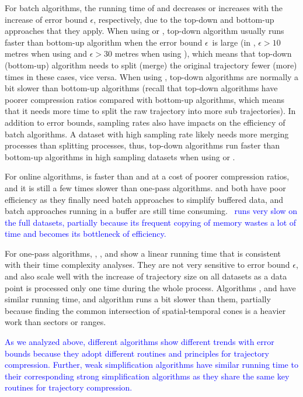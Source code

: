 {For batch algorithms, the running time of \dpa and \tpa decreases or increases with the increase of error bound $\epsilon$, respectively, due to the top-down and bottom-up approaches that they apply. When using \ped or \sed, top-down algorithm usually runs faster than bottom-up algorithm when the error bound $\epsilon$~is large (\eg in \geolife, $\epsilon >10$ metres when using \ped and $\epsilon >30$ metres when using \sed), which means that top-down (bottom-up) algorithm needs to split (merge) the original trajectory fewer (more) times in these cases, vice versa. When using \dad,  top-down algorithms are normally a bit slower than bottom-up algorithms (recall that top-down algorithms have poorer compression ratios compared with bottom-up algorithms, which means that it needs more time to split the raw trajectory into more sub trajectories).
In addition to error bounds, sampling rates also have impacts on the efficiency of batch algorithms. A dataset with high sampling rate likely needs more merging processes than splitting processes, thus, top-down algorithms run faster than bottom-up algorithms in high sampling datasets when using \ped or \sed.

For online algorithms, \squishe is faster than \bqsa and \opwa at a cost of poorer compression ratios, and it is still a few times slower than one-pass algorithms. \bqsa and \opwa both have poor efficiency as they finally need batch approaches to simplify buffered data, and batch approaches running in a buffer are still time consuming. \textcolor{blue}{\dagots~runs very slow on the full datasets, partially because its frequent copying of memory wastes a lot of time and becomes its bottleneck of efficiency.}

For one-pass algorithms, \operb, \siped, \cised and \interval show a linear running time that is consistent with their time complexity analyses. They are not very sensitive to error bound $\epsilon$, and also scale well with the increase of trajectory size on all datasets as a data point is processed only one time during the whole process.
Algorithms \siped, \operb and \interval have similar running time, and algorithm \cised runs a bit slower than them, partially because finding the common intersection of spatial-temporal cones is a heavier work than sectors or ranges.

\textcolor{blue}{As we analyzed above, different algorithms show different trends with error bounds because they adopt different routines and principles for trajectory compression.}
\textcolor{blue}{Further, weak simplification algorithms have similar running time to their corresponding strong simplification algorithms as they share the same key routines for trajectory compression.}



}
